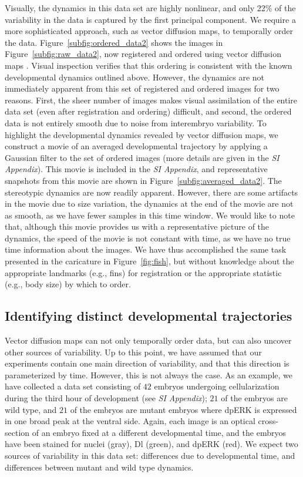 \documentclass{pnastwo}
\begin{document}
\begin{article}
Visually, the dynamics in this data set are highly nonlinear, and only 22\% of the variability in the data is captured by the first principal component.
%
We require a more sophisticated approach, such as vector diffusion maps, to temporally order the data.
%
Figure~\ref{subfig:ordered_data2} shows the images in Figure~\ref{subfig:raw_data2}, now registered and ordered using vector diffusion maps \cite{singer2012vector}.
%
Visual inspection verifies that this ordering is consistent with the known developmental dynamics outlined above.
%
However, the dynamics are not immediately apparent from this set of registered and ordered images for two reasons.
%
First, the sheer number of images makes visual assimilation of the entire data set (even after registration and ordering) difficult, and
second, the ordered data is not entirely smooth due to noise from interembryo variability.
%
To highlight the developmental dynamics revealed by vector diffusion maps, we construct a movie of an averaged developmental trajectory by applying a Gaussian filter to the set of ordered images (more details are given in the {\it SI Appendix}). 
%
This movie is included in the {\it SI Appendix},
and representative snapshots from this movie are shown in Figure~\ref{subfig:averaged_data2}.
%
The stereotypic dynamics are now readily apparent.
%
However, there are some artifacts in the movie due to size variation, the dynamics at the end of the movie are not as smooth, as we have fewer samples in this time window.
%
We would like to note that, although this movie provides us with a representative picture of the dynamics, the speed of the movie is not constant with time, as we have no true time information about the images.
%
We have thus accomplished the same task presented in the caricature in Figure~\ref{fig:fish}, but without knowledge about the appropriate landmarks (e.g., fins) for registration or the appropriate statistic (e.g., body size) by which to order.

\subsection{Identifying distinct developmental trajectories}

Vector diffusion maps can not only temporally order data, but can also uncover other sources of variability.
%
Up to this point, we have assumed that our experiments contain one main direction of variability, and that this direction is parameterized by time.
%
However, this is not always the case.
%
As an example, we have collected a data set consisting of $42$ embryos undergoing cellularization during the third hour of development (see {\it SI Appendix}); $21$ of the embryos are wild type, and $21$ of the embryos are mutant embryos where dpERK is expressed in one broad peak at the ventral side.
%
Again, each image is an optical cross-section of an embryo fixed at a different developmental time, and the embryos have been stained for nuclei (gray), Dl (green), and dpERK (red).
%
We expect two sources of variability in this data set: differences due to developmental time, and differences between mutant and wild type dynamics.


\end{article}
\end{document}
